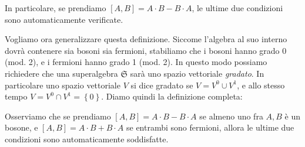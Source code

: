 \documentclass{report}
\begin{document}
In particolare, se prendiamo \([A, B] = A\cdot B - B\cdot A\), le ultime due condizioni sono automaticamente verificate. 

Vogliamo ora generalizzare questa definizione. Siccome l'algebra al suo interno dovrà contenere sia bosoni sia fermioni, stabiliamo che i bosoni hanno grado 0 (mod. 2), e i fermioni hanno grado 1 (mod. 2). In questo modo possiamo richiedere che una superalgebra \(\mathfrak{S}\) sarà uno spazio vettoriale \emph{gradato}. In particolare uno spazio vettoriale \(V\) si dice gradato se \(V = V^0 \cup V^1\), e allo stesso tempo \(V = V^0 \cap V^1 = \left\{0\right\}\). Diamo quindi la definizione completa: 


Osserviamo che se prendiamo \([A, B] = A\cdot B - B\cdot A\) se almeno uno fra \(A, B\) è un bosone, e \([A, B] = A\cdot B + B\cdot A\) se entrambi sono fermioni, allora le ultime due condizioni sono automaticamente soddisfatte.  
\end{document}
